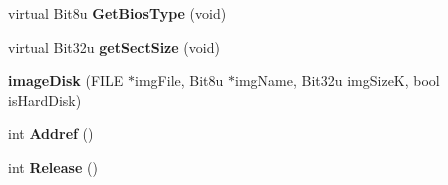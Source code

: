 \begin{DoxyCompactItemize}
\item 
\hypertarget{classimageDisk_a51ff74bed3a9787904ba68ede87335ee}{virtual Bit8u {\bfseries Get\-Bios\-Type} (void)}\label{classimageDisk_a51ff74bed3a9787904ba68ede87335ee}

\item 
\hypertarget{classimageDisk_a1b43cc7b51431451cee90685506db4e1}{virtual Bit32u {\bfseries get\-Sect\-Size} (void)}\label{classimageDisk_a1b43cc7b51431451cee90685506db4e1}

\item 
\hypertarget{classimageDisk_ad1149bdea114f2c61df5252f20638155}{{\bfseries image\-Disk} (F\-I\-L\-E $\ast$img\-File, Bit8u $\ast$img\-Name, Bit32u img\-Size\-K, bool is\-Hard\-Disk)}\label{classimageDisk_ad1149bdea114f2c61df5252f20638155}

\item 
\hypertarget{classimageDisk_a5291cb5aee8b109f4934fc1c24293e91}{int {\bfseries Addref} ()}\label{classimageDisk_a5291cb5aee8b109f4934fc1c24293e91}

\item 
\hypertarget{classimageDisk_a256b0cf2238f1364e3d9675242d69700}{int {\bfseries Release} ()}\label{classimageDisk_a256b0cf2238f1364e3d9675242d69700}

\end{DoxyCompactItemize}
